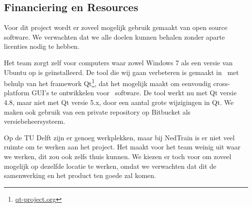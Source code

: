 \subsection{Financiering en Resources}
\label{subsec:resources}
Voor dit project wordt er zoveel mogelijk gebruik gemaakt van open source software. We verwachten dat we alle doelen kunnen behalen zonder aparte licenties nodig te hebben.

Het team zorgt zelf voor computers waar zowel Windows 7 als een versie van Ubuntu op is ge\"installeerd. De tool die wij gaan verbeteren is gemaakt in \cpp\ met behulp van het framework Qt\footnote{\url{qt-project.org}}, dat het mogelijk maakt om eenvoudig cross-platform GUI's te ontwikkelen voor \cpp\ software. De tool werkt nu met Qt versie 4.8, maar niet met Qt versie 5.x, door een aantal grote wijzigingen in Qt. We maken ook gebruik van een private repository op Bitbucket als versiebeheersysteem.

Op de TU Delft zijn er genoeg werkplekken, maar bij NedTrain is er niet veel ruimte om te werken aan het project. Het maakt voor het team weinig uit waar we werken, dit zou ook zelfs thuis kunnen. We kiezen er toch voor om zoveel mogelijk op dezelfde locatie te werken, omdat we verwachten dat dit de samenwerking en het product ten goede zal komen. 

